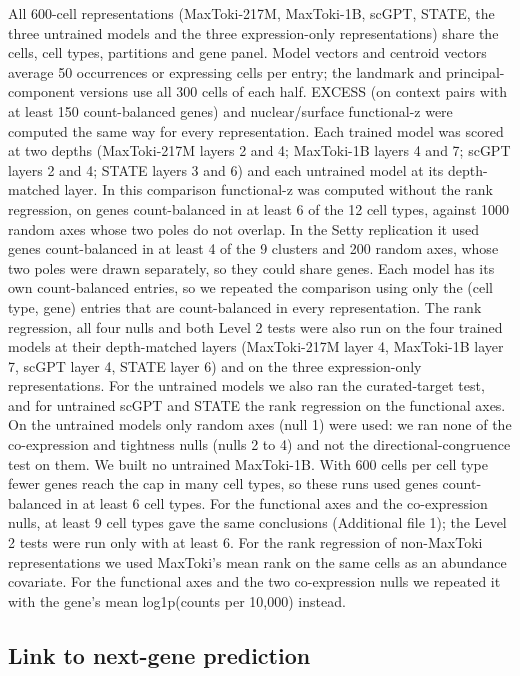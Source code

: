 \documentclass[
  11pt,
]{article}
\newcounter{none} %
\begin{document}
All 600-cell representations (MaxToki-217M, MaxToki-1B, scGPT, STATE,
the three untrained models and the three expression-only
representations) share the cells, cell types, partitions and gene panel.
Model vectors and centroid vectors average 50 occurrences or expressing
cells per entry; the landmark and principal-component versions use all
300 cells of each half. EXCESS (on context pairs with at least 150
count-balanced genes) and nuclear/surface functional-z were computed the
same way for every representation. Each trained model was scored at two
depths (MaxToki-217M layers 2 and 4; MaxToki-1B layers 4 and 7; scGPT
layers 2 and 4; STATE layers 3 and 6) and each untrained model at its
depth-matched layer. In this comparison functional-z was computed
without the rank regression, on genes count-balanced in at least 6 of
the 12 cell types, against 1000 random axes whose two poles do not
overlap. In the Setty replication it used genes count-balanced in at
least 4 of the 9 clusters and 200 random axes, whose two poles were
drawn separately, so they could share genes. Each model has its own
count-balanced entries, so we repeated the comparison using only the
(cell type, gene) entries that are count-balanced in every
representation. The rank regression, all four nulls and both Level 2
tests were also run on the four trained models at their depth-matched
layers (MaxToki-217M layer 4, MaxToki-1B layer 7, scGPT layer 4, STATE
layer 6) and on the three expression-only representations. For the
untrained models we also ran the curated-target test, and for untrained
scGPT and STATE the rank regression on the functional axes. On the
untrained models only random axes (null 1) were used: we ran none of the
co-expression and tightness nulls (nulls 2 to 4) and not the
directional-congruence test on them. We built no untrained MaxToki-1B.
With 600 cells per cell type fewer genes reach the cap in many cell
types, so these runs used genes count-balanced in at least 6 cell types.
For the functional axes and the co-expression nulls, at least 9 cell
types gave the same conclusions (Additional file 1); the Level 2 tests
were run only with at least 6. For the rank regression of non-MaxToki
representations we used MaxToki's mean rank on the same cells as an
abundance covariate. For the functional axes and the two co-expression
nulls we repeated it with the gene's mean log1p(counts per 10,000)
instead.

\subsection{Link to next-gene
prediction}\label{link-to-next-gene-prediction}
\end{document}
